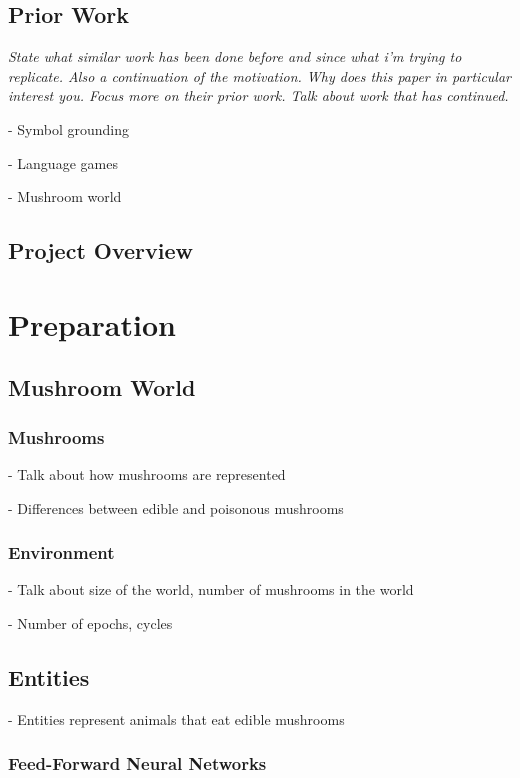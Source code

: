 \documentclass[12pt,a4paper,twoside,openright]{report}
\begin{document}
\section{Prior Work}

\emph{State what similar work has been done before and since what i'm trying to replicate. Also a continuation of the motivation. Why does this paper in particular interest you. Focus more on their prior work. Talk about work that has continued.}

- Symbol grounding

- Language games

- Mushroom world

\section{Project Overview}


\chapter{Preparation}

\section{Mushroom World}

\subsection{Mushrooms}

- Talk about how mushrooms are represented

- Differences between edible and poisonous mushrooms

\subsection{Environment}

- Talk about size of the world, number of mushrooms in the world

- Number of epochs, cycles

\section{Entities}

- Entities represent animals that eat edible mushrooms

\subsection{Feed-Forward Neural Networks}
\end{document}
